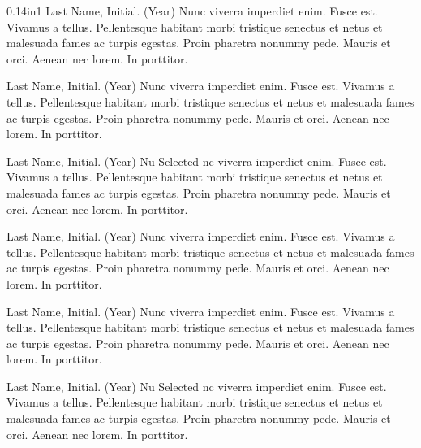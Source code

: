 \documentclass[10pt]{article}
\begin{document}
\begin{hangparas}{0.14in}{1}
Last Name, Initial. (Year) Nunc viverra imperdiet enim. Fusce est. Vivamus a tellus. Pellentesque habitant morbi tristique senectus et netus et malesuada fames ac turpis egestas. Proin pharetra nonummy pede. Mauris et orci. Aenean nec lorem. In porttitor. 

Last Name, Initial. (Year) Nunc viverra imperdiet enim. Fusce est. Vivamus a tellus. Pellentesque habitant morbi tristique senectus et netus et malesuada fames ac turpis egestas. Proin pharetra nonummy pede. Mauris et orci. Aenean nec lorem. In porttitor. 

Last Name, Initial. (Year) Nu Selected nc viverra imperdiet enim. Fusce est. Vivamus a tellus. Pellentesque habitant morbi tristique senectus et netus et malesuada fames ac turpis egestas. Proin pharetra nonummy pede. Mauris et orci. Aenean nec lorem. In porttitor. 

Last Name, Initial. (Year) Nunc viverra imperdiet enim. Fusce est. Vivamus a tellus. Pellentesque habitant morbi tristique senectus et netus et malesuada fames ac turpis egestas. Proin pharetra nonummy pede. Mauris et orci. Aenean nec lorem. In porttitor. 

Last Name, Initial. (Year) Nunc viverra imperdiet enim. Fusce est. Vivamus a tellus. Pellentesque habitant morbi tristique senectus et netus et malesuada fames ac turpis egestas. Proin pharetra nonummy pede. Mauris et orci. Aenean nec lorem. In porttitor.

Last Name, Initial. (Year) Nu Selected nc viverra imperdiet enim. Fusce est. Vivamus a tellus. Pellentesque habitant morbi tristique senectus et netus et malesuada fames ac turpis egestas. Proin pharetra nonummy pede. Mauris et orci. Aenean nec lorem. In porttitor. 


\end{hangparas}

\newpage
\end{document}
